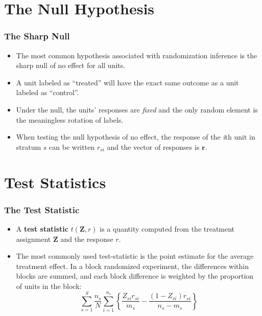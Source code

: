 \documentclass{beamer}
\begin{document}
\section{The Null Hypothesis} %
\label{sec:sharp_null}
\begin{frame}[t]\frametitle{The Sharp Null}
	\begin{itemize}
		\item<+-> The most common hypothesis associated with randomization inference is
		the sharp null of no effect for all units. 
		\item<+->  A unit labeled as ``treated'' will have the exact same outcome as a unit
		labeled as ``control''. 
		\item<+->  Under the null, the  units' responses are \textit{fixed} and the only random element is the meaningless rotation of labels. 
		\item<+-> When testing the null hypothesis of no effect, the response of the
		\textit{i}th unit in stratum $s$ can be written $r_{si} $ and the
		vector of responses is $\textbf{r}$. 
	\end{itemize}	
\end{frame}

\section{Test Statistics} %
\label{sec:test_statistics}

\begin{frame}[c]\frametitle{The Test Statistic}
	\begin{itemize}
		\item<+-> A \textbf{test statistic}
		$t(\mathbf{Z},r)$ is a quantity computed from the treatment assignment
		$\mathbf{Z}$ and the response $r$.
		\item<+-> The most commonly used test-statistic is the point estimate for the
		average treatment effect. In a block randomized experiment, the
		differences within blocks are summed, and each block difference is
		weighted by the proportion of units in the block:  
		$$ \sum_{s=1}^S
		\frac{n_s}{N}\sum_{i=1}^{n_s}\left\{\frac{Z_{si}r_{si}}{m_s}-\frac{(1-Z_{si})r_{si}}{n_s
		    - m_s}\right\}$$			
	\end{itemize}
\end{frame}
\end{document}
